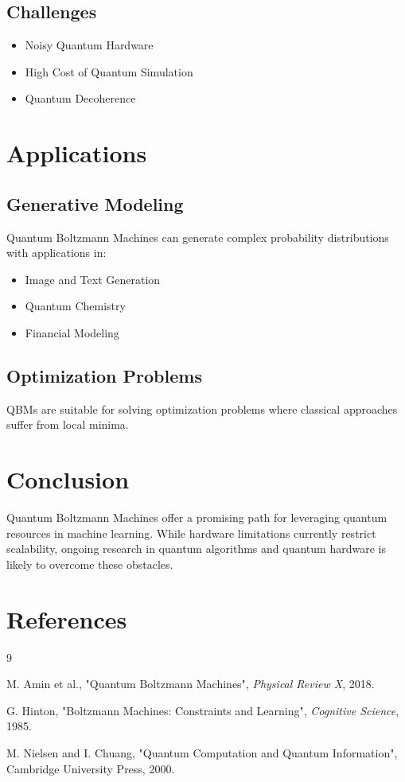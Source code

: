 \documentclass[11pt]{article}
\begin{document}
\subsection{Challenges}
\begin{itemize}
    \item Noisy Quantum Hardware
    \item High Cost of Quantum Simulation
    \item Quantum Decoherence
\end{itemize}

\section{Applications}
\subsection{Generative Modeling}
Quantum Boltzmann Machines can generate complex probability distributions with applications in:
\begin{itemize}
    \item Image and Text Generation
    \item Quantum Chemistry
    \item Financial Modeling
\end{itemize}

\subsection{Optimization Problems}
QBMs are suitable for solving optimization problems where classical approaches suffer from local minima.

\section{Conclusion}
Quantum Boltzmann Machines offer a promising path for leveraging quantum resources in machine learning. While hardware limitations currently restrict scalability, ongoing research in quantum algorithms and quantum hardware is likely to overcome these obstacles.

\section{References}
\begin{thebibliography}{9}

M. Amin et al., "Quantum Boltzmann Machines", \textit{Physical Review X}, 2018.

G. Hinton, "Boltzmann Machines: Constraints and Learning", \textit{Cognitive Science}, 1985.

M. Nielsen and I. Chuang, "Quantum Computation and Quantum Information", Cambridge University Press, 2000.

\end{thebibliography}
\end{document}
